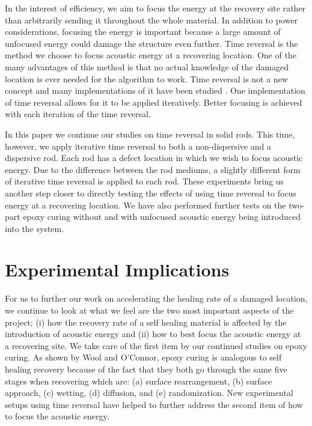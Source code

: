 \documentclass[]{aiaa-tc}%
\begin{document}
In the interest of efficiency, we aim to focus the energy at the recovery site rather than arbitrarily sending it throughout the whole material. In addition to power considerations, focusing the energy is important because a large amount of unfocused energy could damage the structure even further. Time reversal is the method we choose to focus acoustic energy at a recovering location. One of the many advantages of this method is that no actual knowledge of the damaged location is ever needed for the algorithm to work. Time reversal is not a new concept and many implementations of it have been studied \cite{ Anderson2008, Borcea2003, Fink2009, Sutin2004, Harley2009}.  One implementation of time reversal allows for it to be applied iteratively. Better focusing is achieved with each iteration of the time reversal. 

In this paper we continue our studies on time reversal in solid rods. This time, however, we apply iterative time reversal to both a non-dispersive and a dispersive rod. Each rod has a defect location in which we wish to focus acoustic energy. Due to the difference between the rod mediums, a slightly different form of iterative time reversal is applied to each rod. These experiments bring us another step closer to directly testing the effects of using time reversal to focus energy at a recovering location. We have also performed further tests on the two-part epoxy curing without and with unfocused acoustic energy being introduced into the system.

\section{Experimental Implications}

For us to further our work on accelerating the healing rate of a damaged location, we continue to look at what we feel are the two most important aspects of the project; (i) how the recovery rate of a self healing material is affected by the introduction of acoustic energy and (ii) how to best focus the acoustic energy at a recovering site. We take care of the first item by our continued studies on epoxy curing. As shown by Wool and O'Connor, epoxy curing is analogous to self healing recovery because of the fact that they both go through the same five stages when recovering which are: (a) surface rearrangement, (b) surface approach, (c) wetting, (d) diffusion, and (e) randomization. New experimental setups using time reversal have helped to further address the second item of how to focus the acoustic energy.
\end{document}
